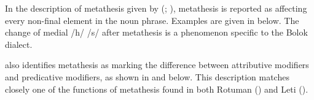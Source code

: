 \begin{exe}\let\eachwordone=\itshape
	\label{ex:KatBukuDehe}
	\label{ex:KatBukuDeeh}
\end{exe}

In the description of metathesis given by \citeauthor{st96b} (\citeyear{st96b}; \citeyear{st08}),
metathesis is reported as affecting every non-final element in the noun phrase.
Examples are given in  below.
The change of medial /h/ {\ra} /s/ after metathesis
is a phenomenon specific to the Bolok dialect.

\newpage
\begin{exe}
	\label{ex:N+adj->Nm adj}
\end{exe}

\citeauthor{st96b} also identifies metathesis as marking the
difference between attributive modifiers and predicative modifiers,
as shown in  and  below.
This description matches closely one of the functions of metathesis
found in both Rotuman () and Leti ().

\begin{exe}\let\eachwordone=\itshape
	\label{ex:LeloDeneq}
	\label{ex:LeolDeneq}
\end{exe}

